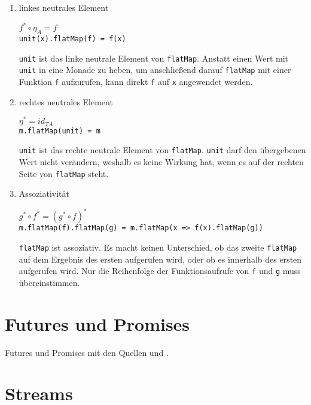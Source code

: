 \begin{enumerate}
  \item linkes neutrales Element

    $f^* \circ \eta_A = f$\\
    \lstinline|unit(x).flatMap(f) = f(x)|

    \lstinline|unit| ist das linke neutrale Element von \lstinline|flatMap|.
    Anstatt einen Wert mit \lstinline|unit| in eine Monade zu heben, um anschließend darauf \lstinline|flatMap| mit einer Funktion \lstinline|f| aufzurufen, kann direkt \lstinline|f| auf \lstinline|x| angewendet werden.

  \item rechtes neutrales Element

    $\eta^* = id_{T A}$\\
    \lstinline|m.flatMap(unit) = m|

    \lstinline|unit| ist das rechte neutrale Element von \lstinline|flatMap|.
    \lstinline|unit| darf den übergebenen Wert nicht verändern, weshalb es keine Wirkung hat, wenn es auf der rechten Seite von \lstinline|flatMap| steht.

  \item Assoziativität

    $g^* \circ f^* = (g^* \circ f)^*$\\
    \lstinline|m.flatMap(f).flatMap(g) = m.flatMap(x => f(x).flatMap(g))|

    \lstinline|flatMap| ist assoziativ.
    Es macht keinen Unterschied, ob das zweite \lstinline|flatMap| auf dem Ergebnis des ersten aufgerufen wird, oder ob es innerhalb des ersten aufgerufen wird.
    Nur die Reihenfolge der Funktionsaufrufe von \lstinline|f| und \lstinline|g| muss übereinstimmen.
\end{enumerate}




\section{Futures und Promises} %
\label{sec:futures_und_promises}

Futures und Promises mit den Quellen \citealt{haller2013} und \citealt{typesafe2013}.



\section{Streams} %
\label{sec:streams}

